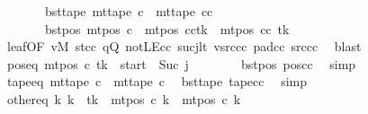 \begin{isabellebody}
\ \ \ \ \ \ \ bst{\isacharunderscore}{\kern0pt}tape{\isacharcolon}{\kern0pt}\ {\isachardoublequoteopen}mt{\isacharunderscore}{\kern0pt}tape\ c{\isacharprime}{\kern0pt}{\isacharprime}{\kern0pt}\ {\isacharequal}{\kern0pt}\ mt{\isacharunderscore}{\kern0pt}tape\ cc{\isachardoublequoteclose}\isanewline
\ \ \ \ \ \ \ bst{\isacharunderscore}{\kern0pt}pos{\isacharcolon}{\kern0pt}\ {\isachardoublequoteopen}mt{\isacharunderscore}{\kern0pt}pos\ c{\isacharprime}{\kern0pt}{\isacharprime}{\kern0pt}\ {\isacharequal}{\kern0pt}\ {\isacharparenleft}{\kern0pt}mt{\isacharunderscore}{\kern0pt}pos\ cc{\isacharparenright}{\kern0pt}{\isacharparenleft}{\kern0pt}tk\ {\isacharcolon}{\kern0pt}{\isacharequal}{\kern0pt}\ mt{\isacharunderscore}{\kern0pt}pos\ cc\ tk\ {\isacharminus}{\kern0pt}\ {}{\isacharparenright}{\kern0pt}{\isachardoublequoteclose}\isanewline
\ \ \ \ \ \ \isamarkupfalse%
\ leaf{\isacharbrackleft}{\kern0pt}OF\ vM\ st{\isacharunderscore}{\kern0pt}cc\ qQ\ notLE{\isacharunderscore}{\kern0pt}cc\ sucj{\isacharunderscore}{\kern0pt}lt\ vsrc{\isacharunderscore}{\kern0pt}cc\ pad{\isacharunderscore}{\kern0pt}cc\ src{\isacharunderscore}{\kern0pt}cc{\isacharbrackright}{\kern0pt}\ \isamarkupfalse%
\ blast\isanewline
\ \ \ \ \isamarkupfalse%
\ pos{\isacharunderscore}{\kern0pt}eq{\isacharcolon}{\kern0pt}\ {\isachardoublequoteopen}mt{\isacharunderscore}{\kern0pt}pos\ c{\isacharprime}{\kern0pt}{\isacharprime}{\kern0pt}\ tk\ {\isacharequal}{\kern0pt}\ {\isacharquery}{\kern0pt}start\ {\isacharminus}{\kern0pt}\ Suc\ j{\isachardoublequoteclose}\isanewline
\ \ \ \ \ \ \isamarkupfalse%
\ bst{\isacharunderscore}{\kern0pt}pos\ pos{\isacharunderscore}{\kern0pt}cc\ \isamarkupfalse%
\ simp\isanewline
\ \ \ \ \isamarkupfalse%
\ tape{\isacharunderscore}{\kern0pt}eq{\isacharcolon}{\kern0pt}\ {\isachardoublequoteopen}mt{\isacharunderscore}{\kern0pt}tape\ c{\isacharprime}{\kern0pt}{\isacharprime}{\kern0pt}\ {\isacharequal}{\kern0pt}\ mt{\isacharunderscore}{\kern0pt}tape\ c{}{\isachardoublequoteclose}\ \isamarkupfalse%
\ bst{\isacharunderscore}{\kern0pt}tape\ tape{\isacharunderscore}{\kern0pt}cc\ \isamarkupfalse%
\ simp\isanewline
\ \ \ \ \isamarkupfalse%
\ other{\isacharunderscore}{\kern0pt}eq{\isacharcolon}{\kern0pt}\ {\isachardoublequoteopen}{\isasymforall}k{\isacharprime}{\kern0pt}{\isachardot}{\kern0pt}\ k{\isacharprime}{\kern0pt}\ {\isasymnoteq}\ tk\ {\isasymlongrightarrow}\ mt{\isacharunderscore}{\kern0pt}pos\ c{\isacharprime}{\kern0pt}{\isacharprime}{\kern0pt}\ k{\isacharprime}{\kern0pt}\ {\isacharequal}{\kern0pt}\ mt{\isacharunderscore}{\kern0pt}pos\ c{}\ k{\isacharprime}{\kern0pt}{\isachardoublequoteclose}\isanewline

\end{isabellebody}
